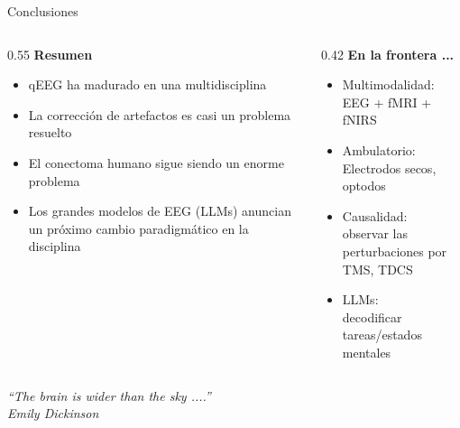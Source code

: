 \begin{frame}{Conclusiones}
  \begin{columns}[T]
    \begin{column}{0.55\textwidth}
      \textbf{Resumen}
      \begin{itemize}
        \item qEEG ha madurado en una multidisciplina
        \item La corrección de artefactos es casi un problema resuelto
        \item El conectoma humano sigue siendo un enorme problema
        \item Los grandes modelos de EEG (LLMs) anuncian un próximo cambio paradigmático en la disciplina
      \end{itemize}
    \end{column}
    \begin{column}{0.42\textwidth}
      \textbf{En la frontera ...}
      \begin{itemize}
        \item Multimodalidad:\\EEG + fMRI + fNIRS
        \item Ambulatorio:\\Electrodos secos, optodos
        \item Causalidad:\\observar las perturbaciones por TMS, TDCS
        \item LLMs:\\decodificar tareas/estados mentales
      \end{itemize}
    \end{column}
  \end{columns}
  \vspace{0.5em}
  \begin{center}
    \alert{\textit{``The brain is wider than the sky ....'' \\ Emily Dickinson}}
  \end{center}
\end{frame}
